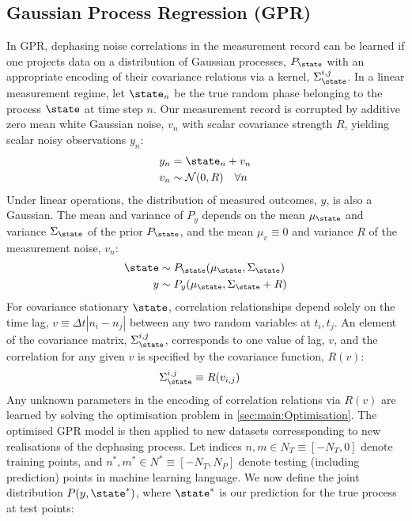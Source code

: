 \subsection{Gaussian Process Regression (GPR)}

In GPR, dephasing noise correlations in the measurement record can be learned if one projects data on a distribution of Gaussian processes, $P_\state$ with an appropriate encoding of their covariance relations via a kernel, $\Sigma_\state^{i,j}$. In a linear measurement regime, let $\state_n$ be the true random phase belonging to the process $\state$ at time step $n$. Our measurement record is corrupted by additive zero mean white Gaussian noise, $v_n$ with scalar covariance strength $R$, yielding scalar noisy observations $y_n$:
\begin{align}
y_n &= \state_n + v_n \\
v_n & \sim \mathcal{N}(0, R) \quad \forall n
\end{align}
Under linear operations, the distribution of measured outcomes, $y$, is also a Gaussian. The  mean and variance of $P_y$ depends on the mean $\mu_\state$ and variance $\Sigma_\state$ of the prior $P_\state$, and the mean $\mu_v \equiv 0$ and variance $R$ of the measurement noise, $v_n$: 
\begin{align}
\state & \sim P_\state(\mu_\state,\Sigma_\state ) \\
y & \sim P_y(\mu_\state,\Sigma_\state + R ) 
\end{align}
For covariance stationary $\state$, correlation relationships depend solely on the time lag, $v \equiv \Delta t|n_i - n_j|$ between any two random variables at $t_i, t_j$.  An element of the covariance matrix, $\Sigma_\state^{i,j}$, corresponds to one value of lag, $v$, and the correlation for any given $v$  is specified by the covariance function, $R(v)$:
\begin{align}
\Sigma_\state^{i,j} & \equiv R(v_{i,j}) 
\end{align}
Any unknown parameters in the encoding of correlation relations via $R(v)$ are learned by solving the optimisation problem in \cref{sec:main:Optimisation}. The optimised GPR model is then applied to new datasets corressponding to new realisations of the dephasing process. Let indices $n,m \in N_T \equiv [-N_T, 0]$ denote training points, and $n^*,m^* \in N^* \equiv [-N_T, N_P]$ denote testing (including prediction) points in machine learning language. We now define the joint distribution $P(y,\state^*)$, where $\state^*$ is our prediction for the true process at test points: 
